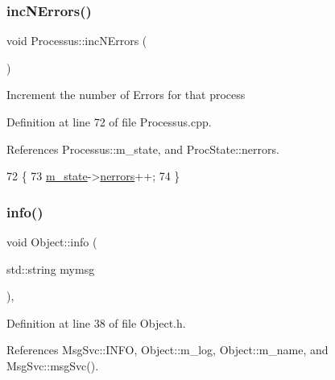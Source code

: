 \subsubsection{\texorpdfstring{inc\+N\+Errors()}{incNErrors()}}
{\footnotesize\ttfamily void Processus\+::inc\+N\+Errors (\begin{DoxyParamCaption}{ }\end{DoxyParamCaption})\hspace{0.3cm}{\ttfamily [inherited]}}

Increment the number of Errors for that process 

Definition at line 72 of file Processus.\+cpp.



References Processus\+::m\+\_\+state, and Proc\+State\+::nerrors.


\begin{DoxyCode}
72                            \{
73   \hyperlink{classProcessus_ab3539eee42891ceae0baf4395ae7fb61}{m\_state}->\hyperlink{structProcState_a51a0f54ba62b07e07ac8518c5f32828d}{nerrors}++;
74 \}
\end{DoxyCode}
\mbox{\label{classObject_a644fd329ea4cb85f54fa6846484b84a8}} 
\subsubsection{\texorpdfstring{info()}{info()}\hspace{0.1cm}{\footnotesize\ttfamily [1/2]}}
{\footnotesize\ttfamily void Object\+::info (\begin{DoxyParamCaption}\item[{std\+::string}]{mymsg }\end{DoxyParamCaption})\hspace{0.3cm}{\ttfamily [inline]}, {\ttfamily [inherited]}}



Definition at line 38 of file Object.\+h.



References Msg\+Svc\+::\+I\+N\+FO, Object\+::m\+\_\+log, Object\+::m\+\_\+name, and Msg\+Svc\+::msg\+Svc().



